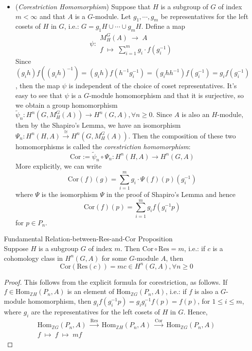 \begin{itemize}
    \item (\textit{Corestriction Homomorphism}) Suppose that $H$ is a subgroup of $G$ of index $m<\infty$ and that $A$ is a $G$-module. Let $g_1,\cdots,g_m$ be representatives for the left cosets of $H$ in $G$, i.e.: $G= g_1H\cup \cdots \cup g_mH$. Define a map
    \[
    \psi: \substack{M_H^G(A) \;\to\; A\\
    f\;\mapsto\; \sum_{i=1}^m g_i\cdot f(g_i^{-1})}
    \]
    Since $(g_ih) f((g_ih)^{-1})= (g_ih)f(h^{-1}g_i^{-1})= (g_ihh^{-1})f(g_i^{-1})= g_if(g_i^{-1})$, then the map $\psi$ is independent of the choice of coset representatives. It's easy to see that $\psi$ is a $G$-module homomorphism and that it is surjective, so we obtain a group homomorphism $\widetilde{\psi}_n: H^n(G,M_H^G(A)) \to H^n(G,A), \forall n\geq 0$. Since $A$ is also an $H$-module, then by the Shapiro's Lemma, we have an isomorphism $\Psi_n:H^n(H,A) \xrightarrow{\cong} H^n(G,M_H^G(A))$. Then the composition of these two homomorphisms is called the \textit{corestriction homomorphism}:
    \[
    \text{Cor}:= \widetilde{\psi}_n \circ \Psi_n: H^n(H,A) \to H^n(G,A)
    \]
    More explicitly, we can write
    \[
    \text{Cor}(f)(g)= \sum_{i=1}^m g_i\cdot \Psi(f)(p)(g_i^{-1})
    \]
    where $\Psi$ is the isomorphism $\Psi$ in the proof of Shapiro's Lemma and hence
    \[
    \text{Cor}(f)(p)= \sum_{i=1}^m g_if(g_i^{-1}p)
    \]
    for $p\in P_n$.
\end{itemize}

\begin{proposition}{Fundamental Relation-between-Res-and-Cor Proposition}\\
Suppose $H$ is a subgroup $G$ of index $m$. Then $\text{Cor} \circ \text{Res}=m$, i.e.: if $c$ is a cohomology class in $H^n(G,A)$ for some $G$-module $A$, then
\[
\text{Cor} (\text{Res}(c))=mc\in H^n(G,A) ,\forall n\geq0
\]
\end{proposition}

\begin{proof}
    This follows from the explicit formula for corestriction, as follows. If $f\in \text{Hom}_{\mathbb{Z}H} (P_n,A)$ is an element of $\text{Hom}_{\mathbb{Z}G} (P_n,A)$, i.e.: if $f$ is also a $G$-module homomorphism, then $g_if(g_i^{-1}p)= g_ig_i^{-1} f(p) =f(p)$, for $1\leq i\leq m$, where $g_i$ are the representatives for the left cosets of $H$ in $G$. Hence,
    \[
    \substack{\text{Hom}_{\mathbb{Z}G}(P_n,A) \;\xrightarrow{\text{Res}} \; \text{Hom}_{\mathbb{Z}H} (P_n,A)\;\xrightarrow{\text{Cor}} \; \text{Hom}_{\mathbb{Z}G} (P_n,A)\\
    f\;\mapsto\; f\;\mapsto\; mf}
    \]
\end{proof}


